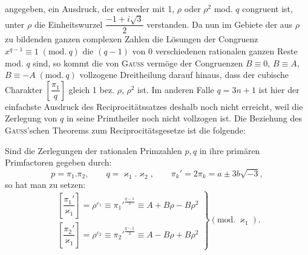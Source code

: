 \noindent\unskip{}angegeben, ein Ausdruck, der entweder mit 1, $\rho$ oder $\rho^2$ mod. $q$ congruent ist, unter $\rho$ die Einheitswurzel
$\dfrac{-1+i\sqrt{3}}{2}$ verstanden. Da nun im Gebiete der aus $\rho$ zu bildenden ganzen complexen Zahlen die Lösungen
der Congruenz $x^{q-1}\equiv 1\;(\mathrm{mod.}\ q)$ die $(q-1)$ von 0 verschiedenen rationalen ganzen Reste mod. $q$ sind,
so kommt die von \textsc{Gauss} vermöge der Congruenzen $B\equiv 0$, $B\equiv A$, $B\equiv -A\;(\mathrm{mod.}\ q)$ vollzogene Dreitheilung darauf hinaus, dass der cubische Charakter $\left[\dfrac{\pi_1}{q}\right]$ gleich 1 bez. $\rho$, $\rho^2$ ist. Im anderen Falle $q=3n+1$
ist hier der einfachste Ausdruck des Reciprocitätssatzes deshalb noch nicht erreicht, weil die Zerlegung von
$q$ in seine Primtheiler noch nicht vollzogen ist. Die Beziehung des \textsc{Gauss}'schen Theorems zum Reciprocitätsgesetze ist die folgende:

Sind die Zerlegungen der rationalen Primzahlen $p, q$ in ihre primären Primfactoren gegeben durch:
\[ p=\pi_1.\pi_2,\qquad q=\varkappa_1.\varkappa_2,\qquad \pi_k'=2\pi_k=a\pm 3b\sqrt{-3}, \]
so hat man zu setzen:
\[
\left.\begin{array}{l}
\left[\dfrac{\pi_1'}{\varkappa_1}\right]=\rho^{\varepsilon_1}\equiv {\pi_1'}^{\frac{q-1}{3}}\equiv A+B\rho-B\rho^2 \\[2mm]
\left[\dfrac{\pi_2'}{\varkappa_1}\right]=\rho^{\varepsilon_2}\equiv {\pi_2'}^{\frac{q-1}{3}}\equiv A-B\rho+B\rho^2
\end{array}\right\}(\mathrm{mod.}\ \varkappa_1).
\]

